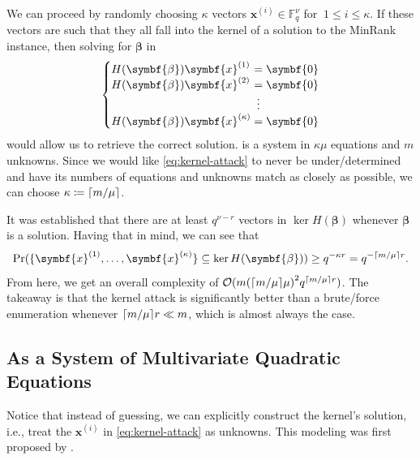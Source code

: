 \documentclass[version=last, paper=A4, parskip=half, oneside,%
toc=bibliography, toc=listof, listof=leveldown]{scrbook}
\theoremstyle{plain}
\theoremstyle{definition}
\theoremstyle{remark}
\renewcommand*{\vec}{\symbf}
\newcommand*{\FF}{\ensuremath{\mathbb{F}}}
\DeclarePairedDelimiter{\ceil}{\lceil}{\rceil}
\begin{document}
We can proceed by randomly choosing $\kappa$ vectors
\(\vec{x}^{(i)} \in \FF_q^{\nu}\) for \(\ 1 \le i \le \kappa\).  If these
vectors are such that they all fall into the kernel of a solution to the MinRank
instance, then solving for \(\vec{\beta}\) in
\begin{equation}\label{eq:kernel-attack}
  \setlength{\arraycolsep}{0pt}
  \newcolumntype{B}{>{{}}c<{{}}}
  \left\{
    \begin{array}{l B l}
      H(\vec{\beta}) \vec{x}^{(1)} & = & \vec{0} \\
      H(\vec{\beta}) \vec{x}^{(2)} & = & \vec{0} \\
                                   & \vdots & \\
      H(\vec{\beta}) \vec{x}^{(\kappa)} & = & \vec{0}
    \end{array}
  \right.
\end{equation}
would allow us to retrieve the correct solution.   is a
system in \(\kappa \mu\) equations and \(m\) unknowns.  Since we would like
\cref{eq:kernel-attack} to never be under\-/determined and have its numbers of
equations and unknowns match as closely as possible, we can choose
\(\kappa \coloneqq \ceil{m / {\mu}}\).

It was established that there are at least \(q^{\nu - r}\) vectors in
\(\ker H(\vec{\beta})\) whenever \(\vec{\beta}\) is a solution.  Having that in
mind, we can see that
\[
  \Pr(\{\vec{x}^{(1)}, \ldots, \vec{x}^{(\kappa)}\} \subseteq \ker H(\vec{\beta})) \ge q^{-\kappa r} = q^{-\ceil{m / {\mu}} r}\text.
\]
From here, we get an overall complexity of
\(\mathcal{O}(m {(\ceil{m / {\mu}} \mu)}^2 q^{\ceil{m / {\mu}} r})\).  The
takeaway is that the kernel attack is significantly better than a brute\-/force
enumeration whenever \(\ceil{m / {\mu}} r \ll m\), which is almost always the
case.

\subsection{As a System of Multivariate Quadratic Equations}

Notice that instead of guessing, we can explicitly construct the kernel's
solution, i.e., treat the \(\vec{x}^{(i)}\) in \cref{eq:kernel-attack} as
unknowns.  This modeling was first proposed by \textcite{KS99}.
\end{document}
